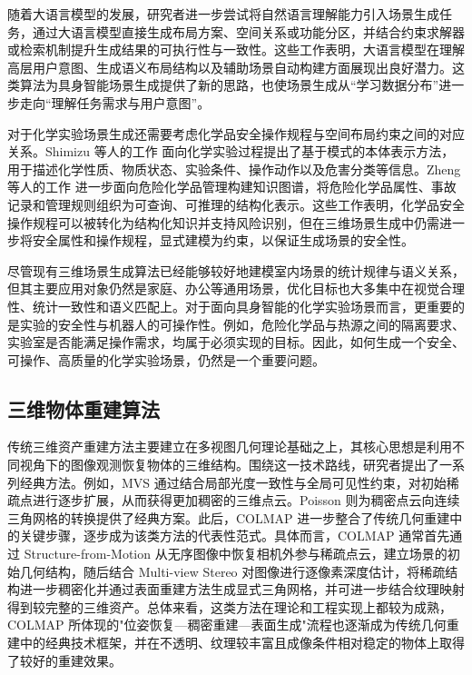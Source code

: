 随着大语言模型的发展，研究者进一步尝试将自然语言理解能力引入场景生成任务，通过大语言模型直接生成布局方案、空间关系或功能分区，并结合约束求解器或检索机制提升生成结果的可执行性与一致性\cite{aguinakang2024openuniverse,celen2024idesign,hu2024scenecraft,ocal2024sceneteller,yang2024llplace,wang2024chat2layout,feng2023layoutgpt,yang2024holodeck}。这些工作表明，大语言模型在理解高层用户意图、生成语义布局结构以及辅助场景自动构建方面展现出良好潜力。这类算法为具身智能场景生成提供了新的思路，也使场景生成从“学习数据分布”进一步走向“理解任务需求与用户意图”。

对于化学实验场景生成还需要考虑化学品安全操作规程与空间布局约束之间的对应关系。Shimizu 等人的工作\cite{shimizu2018pattern} 面向化学实验过程提出了基于模式的本体表示方法，用于描述化学性质、物质状态、实验条件、操作动作以及危害分类等信息。Zheng 等人的工作\cite{zheng2021hazardouskg} 进一步面向危险化学品管理构建知识图谱，将危险化学品属性、事故记录和管理规则组织为可查询、可推理的结构化表示。这些工作表明，化学品安全操作规程可以被转化为结构化知识并支持风险识别，但在三维场景生成中仍需进一步将安全属性和操作规程，显式建模为约束，以保证生成场景的安全性。

尽管现有三维场景生成算法已经能够较好地建模室内场景的统计规律与语义关系，但其主要应用对象仍然是家庭、办公等通用场景，优化目标也大多集中在视觉合理性、统计一致性和语义匹配上。对于面向具身智能的化学实验场景而言，更重要的是实验的安全性与机器人的可操作性。例如，危险化学品与热源之间的隔离要求、实验室是否能满足操作需求，均属于必须实现的目标。因此，如何生成一个安全、可操作、高质量的化学实验场景，仍然是一个重要问题。


\subsection{三维物体重建算法}
\label{subsec:asset_reconstruction}

传统三维资产重建方法主要建立在多视图几何理论基础之上，其核心思想是利用不同视角下的图像观测恢复物体的三维结构。围绕这一技术路线，研究者提出了一系列经典方法。例如，MVS\cite{furukawa2010mvs} 通过结合局部光度一致性与全局可见性约束，对初始稀疏点进行逐步扩展，从而获得更加稠密的三维点云。Poisson \cite{kazhdan2006poisson} 则为稠密点云向连续三角网格的转换提供了经典方案。此后，COLMAP\cite{schonberger2016sfm} 进一步整合了传统几何重建中的关键步骤，逐步成为该类方法的代表性范式。具体而言，COLMAP 通常首先通过 Structure-from-Motion 从无序图像中恢复相机外参与稀疏点云，建立场景的初始几何结构，随后结合 Multi-view Stereo 对图像进行逐像素深度估计，将稀疏结构进一步稠密化并通过表面重建方法生成显式三角网格，并可进一步结合纹理映射得到较完整的三维资产。总体来看，这类方法在理论和工程实现上都较为成熟，COLMAP 所体现的"位姿恢复—稠密重建—表面生成"流程也逐渐成为传统几何重建中的经典技术框架，并在不透明、纹理较丰富且成像条件相对稳定的物体上取得了较好的重建效果。


